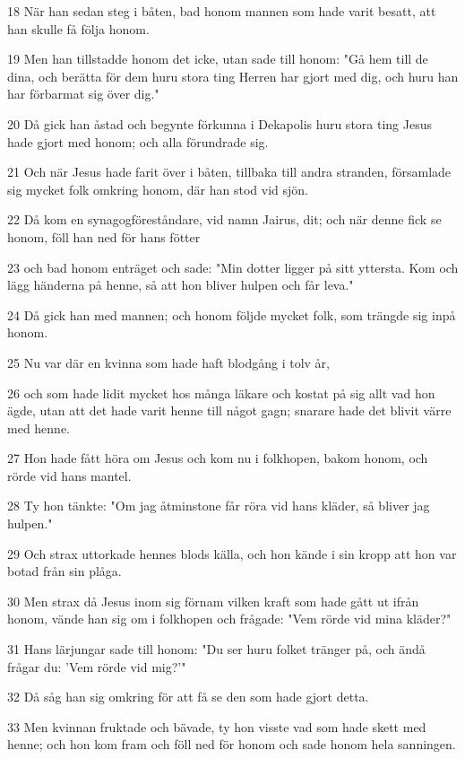 \par 18 När han sedan steg i båten, bad honom mannen som hade varit besatt, att han skulle få följa honom.
\par 19 Men han tillstadde honom det icke, utan sade till honom: "Gå hem till de dina, och berätta för dem huru stora ting Herren har gjort med dig, och huru han har förbarmat sig över dig."
\par 20 Då gick han åstad och begynte förkunna i Dekapolis huru stora ting Jesus hade gjort med honom; och alla förundrade sig.
\par 21 Och när Jesus hade farit över i båten, tillbaka till andra stranden, församlade sig mycket folk omkring honom, där han stod vid sjön.
\par 22 Då kom en synagogföreståndare, vid namn Jairus, dit; och när denne fick se honom, föll han ned för hans fötter
\par 23 och bad honom enträget och sade: "Min dotter ligger på sitt yttersta. Kom och lägg händerna på henne, så att hon bliver hulpen och får leva."
\par 24 Då gick han med mannen; och honom följde mycket folk, som trängde sig inpå honom.
\par 25 Nu var där en kvinna som hade haft blodgång i tolv år,
\par 26 och som hade lidit mycket hos många läkare och kostat på sig allt vad hon ägde, utan att det hade varit henne till något gagn; snarare hade det blivit värre med henne.
\par 27 Hon hade fått höra om Jesus och kom nu i folkhopen, bakom honom, och rörde vid hans mantel.
\par 28 Ty hon tänkte: "Om jag åtminstone får röra vid hans kläder, så bliver jag hulpen."
\par 29 Och strax uttorkade hennes blods källa, och hon kände i sin kropp att hon var botad från sin plåga.
\par 30 Men strax då Jesus inom sig förnam vilken kraft som hade gått ut ifrån honom, vände han sig om i folkhopen och frågade: "Vem rörde vid mina kläder?"
\par 31 Hans lärjungar sade till honom: "Du ser huru folket tränger på, och ändå frågar du: 'Vem rörde vid mig?'"
\par 32 Då såg han sig omkring för att få se den som hade gjort detta.
\par 33 Men kvinnan fruktade och bävade, ty hon visste vad som hade skett med henne; och hon kom fram och föll ned för honom och sade honom hela sanningen.
